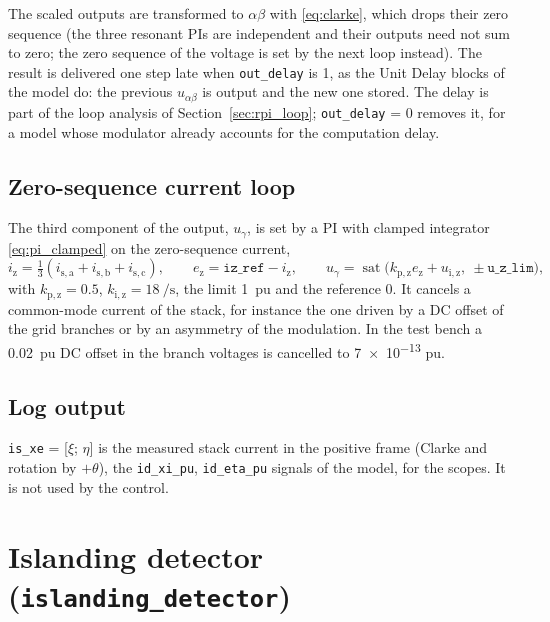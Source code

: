 \documentclass[11pt,a4paper]{scrartcl}
\newcommand{\ped}[1]{_{\mathrm{#1}}}
\newcommand{\code}[1]{\texttt{#1}}
\newcommand{\sat}{\operatorname{sat}}
\begin{document}
\begin{onehalfspace}
The scaled outputs are transformed to $\alpha\beta$ with \eqref{eq:clarke}, which drops their zero sequence (the three resonant PIs are independent and their outputs need not sum to zero; the zero sequence of the voltage is set by the next loop instead). The result is delivered one step late when \code{out\_delay} is 1, as the Unit Delay blocks of the model do: the previous $u_{\alpha\beta}$ is output and the new one stored. The delay is part of the loop analysis of Section~\ref{sec:rpi_loop}; \code{out\_delay} = 0 removes it, for a model whose modulator already accounts for the computation delay.

\subsection{Zero-sequence current loop}
\label{sec:zseq}

The third component of the output, $u_\gamma$, is set by a PI with clamped integrator \eqref{eq:pi_clamped} on the zero-sequence current,
\begin{equation}
	i\ped{z} = \tfrac{1}{3}\left(i\ped{s,a} + i\ped{s,b} + i\ped{s,c}\right), \qquad e\ped{z} = \code{iz\_ref} - i\ped{z}, \qquad u_\gamma = \sat\!\big(k\ped{p,z} e\ped{z} + u\ped{i,z},\ \pm\code{u\_z\_lim}\big),
	\label{eq:zseq}
\end{equation}
with $k\ped{p,z} = 0.5$, $k\ped{i,z} = \SI{18}{\per\second}$, the limit \SI{1}{pu} and the reference 0. It cancels a common-mode current of the stack, for instance the one driven by a DC offset of the grid branches or by an asymmetry of the modulation. In the test bench a \SI{0.02}{pu} DC offset in the branch voltages is cancelled to \num{7e-13} pu.

\subsection{Log output}

\code{is\_xe} = [$\xi$; $\eta$] is the measured stack current in the positive frame (Clarke and rotation by $+\theta$), the \code{id\_xi\_pu}, \code{id\_eta\_pu} signals of the model, for the scopes. It is not used by the control.

\section{Islanding detector (\code{islanding\_detector})}
\label{sec:island}


\end{onehalfspace}
\end{document}
